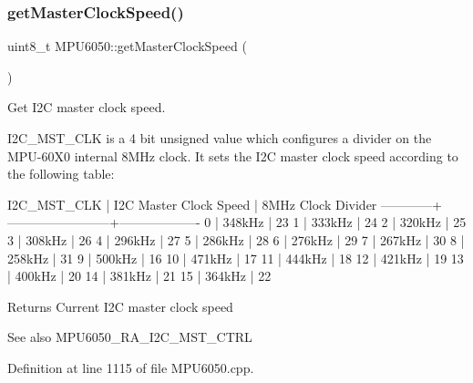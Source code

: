 \subsubsection{\texorpdfstring{getMasterClockSpeed()}{getMasterClockSpeed()}}
{\footnotesize\ttfamily uint8\+\_\+t M\+P\+U6050\+::get\+Master\+Clock\+Speed (\begin{DoxyParamCaption}{ }\end{DoxyParamCaption})}



Get I2C master clock speed. 

I2\+C\+\_\+\+M\+S\+T\+\_\+\+C\+LK is a 4 bit unsigned value which configures a divider on the M\+P\+U-\/60\+X0 internal 8M\+Hz clock. It sets the I2C master clock speed according to the following table\+:


\begin{DoxyPre}
I2C\_MST\_CLK | I2C Master Clock Speed | 8MHz Clock Divider
------------+------------------------+-------------------
0           | 348kHz                 | 23
1           | 333kHz                 | 24
2           | 320kHz                 | 25
3           | 308kHz                 | 26
4           | 296kHz                 | 27
5           | 286kHz                 | 28
6           | 276kHz                 | 29
7           | 267kHz                 | 30
8           | 258kHz                 | 31
9           | 500kHz                 | 16
10          | 471kHz                 | 17
11          | 444kHz                 | 18
12          | 421kHz                 | 19
13          | 400kHz                 | 20
14          | 381kHz                 | 21
15          | 364kHz                 | 22
\end{DoxyPre}


\begin{DoxyReturn}{Returns}
Current I2C master clock speed 
\end{DoxyReturn}
\begin{DoxySeeAlso}{See also}
M\+P\+U6050\+\_\+\+R\+A\+\_\+\+I2\+C\+\_\+\+M\+S\+T\+\_\+\+C\+T\+RL 
\end{DoxySeeAlso}


Definition at line 1115 of file M\+P\+U6050.\+cpp.

\mbox{\label{classMPU6050_a574d3093dc131e4251a9b37adf208ca7}} 
